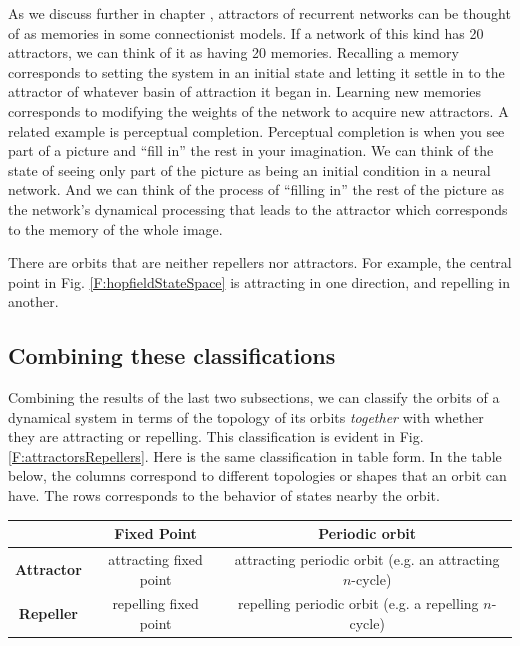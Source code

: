 As we discuss further in chapter , attractors of recurrent networks can be thought of as memories in some connectionist models. If a network of this kind has 20  attractors, we can think of it as having 20 memories. Recalling a memory corresponds to setting the system in an initial state and letting it settle in to the attractor of whatever basin of attraction it began in. Learning new memories corresponds to modifying the weights of the network to acquire new attractors. A related  example is perceptual completion. Perceptual completion is when you see part 
of a picture and ``fill in'' the rest in your imagination. We can think of 
the state of seeing only part of the picture as being an initial condition in a 
neural network. And we can think of the process of ``filling in'' the rest of 
the picture as the network's dynamical processing that leads to the attractor 
which corresponds to the memory of the whole image. 

There are orbits that are neither repellers nor attractors. For example, the central point in Fig. \ref{F:hopfieldStateSpace} is attracting in one direction, and repelling in another.

\subsection{Combining these classifications}

Combining the results of the last two subsections, we can classify the orbits of a dynamical system in terms of the topology of its orbits \emph{together} with whether they are attracting or repelling. This classification is evident in Fig. \ref{F:attractorsRepellers}. Here is the same classification in table form. In the table below, the columns correspond to different topologies or shapes  that an orbit can have. The rows corresponds to the behavior of states nearby the orbit.

\begin{center}
\begin{tabular}{| c | c | c |}
\hline
& {\bf Fixed Point} & {\bf Periodic orbit}  \\
\hline
{\bf Attractor} & attracting fixed point & attracting periodic orbit (e.g. an attracting $n$-cycle) \\
\hline
{\bf Repeller} &  repelling fixed point & repelling periodic orbit  (e.g. a repelling $n$-cycle)  \\
\hline
\end{tabular}
\end{center}

